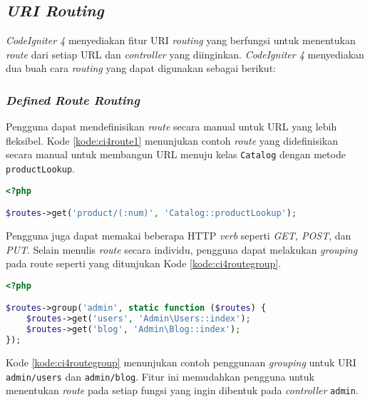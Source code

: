 \subsection{\textit{URI Routing}}
\textit{CodeIgniter 4} menyediakan fitur URI \textit{routing} yang berfungsi untuk menentukan \textit{route} dari setiap URL dan \textit{controller} yang diinginkan. \textit{CodeIgniter 4} menyediakan dua buah cara \textit{routing} yang dapat digunakan sebagai berikut:
\subsubsection{\textit{Defined Route Routing}}
Pengguna dapat mendefinisikan \textit{route} secara manual untuk URL yang lebih fleksibel. Kode \ref{kode:ci4route1} menunjukan contoh \textit{route} yang didefinisikan secara manual untuk membangun URL menuju kelas \texttt{Catalog} dengan metode \texttt{productLookup}.
\begin{lstlisting}[language=PHP,caption=Contoh \textit{route} yang didefinisikan secara manual,label=kode:ci4route1]
<?php

$routes->get('product/(:num)', 'Catalog::productLookup');
\end{lstlisting}
Pengguna juga dapat memakai beberapa HTTP \textit{verb} seperti \textit{GET, POST}, dan \textit{PUT}. Selain menulis \textit{route} secara individu, pengguna dapat melakukan \textit{grouping} pada route seperti yang ditunjukan Kode \ref{kode:ci4routegroup}.
\begin{lstlisting}[language=PHP,caption=Contoh \textit{route} yang menggunakan \textit{grouping} manual,label=kode:ci4routegroup]
<?php

$routes->group('admin', static function ($routes) {
    $routes->get('users', 'Admin\Users::index');
    $routes->get('blog', 'Admin\Blog::index');
});
\end{lstlisting}

Kode \ref{kode:ci4routegroup} menunjukan contoh penggunaan \textit{grouping} untuk URI \texttt{admin/users} dan \texttt{admin/blog}. Fitur ini memudahkan pengguna untuk menentukan \textit{route} pada setiap fungsi yang ingin dibentuk pada \textit{controller} \texttt{admin}.

